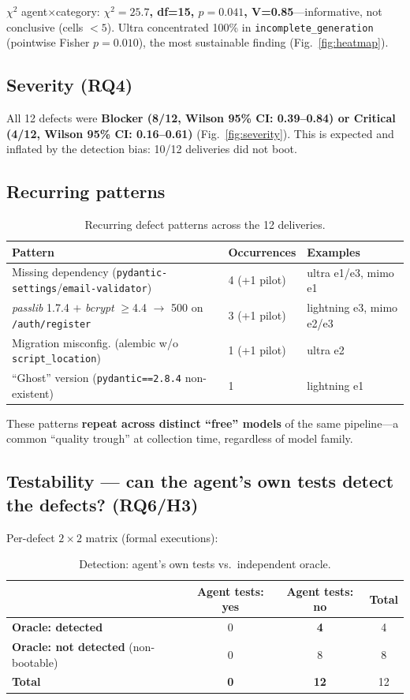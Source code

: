 \documentclass[sigconf,anonymous]{acmart}
\begin{document}
$\chi^2$ agent$\times$category: \textbf{$\chi^2=25.7$, df=15, $p=0.041$, V=0.85}---informative, not conclusive (cells $<5$). Ultra concentrated 100\% in \texttt{incomplete\_generation} (pointwise Fisher \textbf{$p=0.010$}), the most sustainable finding (Fig.~\ref{fig:heatmap}).

\subsection{Severity (RQ4)}
All 12 defects were \textbf{Blocker (8/12, Wilson 95\% CI: 0.39--0.84) or Critical (4/12, Wilson 95\% CI: 0.16--0.61)} (Fig.~\ref{fig:severity}). This is expected and inflated by the detection bias: 10/12 deliveries did not boot.

\subsection{Recurring patterns}
\begin{table}[t]
\caption{Recurring defect patterns across the 12 deliveries.}
\label{tab:patterns}
\small
\begin{tabular}{lll}
\toprule
\textbf{Pattern} & \textbf{Occurrences} & \textbf{Examples}\\
\midrule
Missing dependency (\texttt{pydantic-settings}/\texttt{email-validator}) & 4 (+1 pilot) & ultra e1/e3, mimo e1\\
\emph{passlib} 1.7.4 $+$ \emph{bcrypt} $\ge$4.4 $\rightarrow$ 500 on \texttt{/auth/register} & 3 (+1 pilot) & lightning e3, mimo e2/e3\\
Migration misconfig. (alembic w/o \texttt{script\_location}) & 1 (+1 pilot) & ultra e2\\
``Ghost'' version (\texttt{pydantic==2.8.4} non-existent) & 1 & lightning e1\\
\bottomrule
\end{tabular}
\end{table}

These patterns \textbf{repeat across distinct ``free'' models} of the same pipeline---a common ``quality trough'' at collection time, regardless of model family.

\subsection{Testability --- can the agent's own tests detect the defects? (RQ6/H3)}
Per-defect $2\times2$ matrix (formal executions):

\begin{table}[t]
\caption{Detection: agent's own tests vs.\ independent oracle.}
\label{tab:h3}
\small
\begin{tabular}{lccc}
\toprule
 & \textbf{Agent tests: yes} & \textbf{Agent tests: no} & \textbf{Total}\\
\midrule
\textbf{Oracle: detected} & 0 & \textbf{4} & 4\\
\textbf{Oracle: not detected} (non-bootable) & 0 & 8 & 8\\
\textbf{Total} & \textbf{0} & \textbf{12} & 12\\
\bottomrule
\end{tabular}
\end{table}
\end{document}
